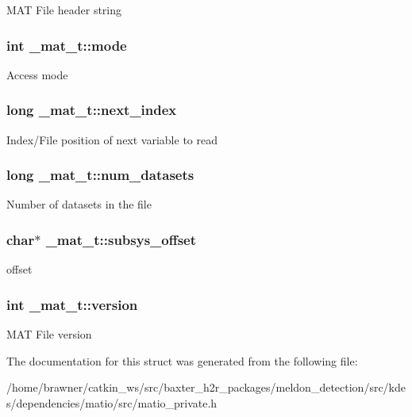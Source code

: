 M\-A\-T File header string \hypertarget{struct__mat__t_aa43288b63b8edb7cadf0b79e2d1df2ee}{
\subsubsection[{mode}]{\setlength{\rightskip}{0pt plus 5cm}int \-\_\-mat\-\_\-t\-::mode}}\label{struct__mat__t_aa43288b63b8edb7cadf0b79e2d1df2ee}
Access mode \hypertarget{struct__mat__t_ab673fe0b330cf4666a66924e37d908d8}{
\subsubsection[{next\-\_\-index}]{\setlength{\rightskip}{0pt plus 5cm}long \-\_\-mat\-\_\-t\-::next\-\_\-index}}\label{struct__mat__t_ab673fe0b330cf4666a66924e37d908d8}
Index/\-File position of next variable to read \hypertarget{struct__mat__t_afa714cbc14c9846e8e62df7cae0a9181}{
\subsubsection[{num\-\_\-datasets}]{\setlength{\rightskip}{0pt plus 5cm}long \-\_\-mat\-\_\-t\-::num\-\_\-datasets}}\label{struct__mat__t_afa714cbc14c9846e8e62df7cae0a9181}
Number of datasets in the file \hypertarget{struct__mat__t_a19317c01209959d755d69311960d3eec}{
\subsubsection[{subsys\-\_\-offset}]{\setlength{\rightskip}{0pt plus 5cm}char$\ast$ \-\_\-mat\-\_\-t\-::subsys\-\_\-offset}}\label{struct__mat__t_a19317c01209959d755d69311960d3eec}
offset \hypertarget{struct__mat__t_a729c2bc0afc97485057a5af425635b1a}{
\subsubsection[{version}]{\setlength{\rightskip}{0pt plus 5cm}int \-\_\-mat\-\_\-t\-::version}}\label{struct__mat__t_a729c2bc0afc97485057a5af425635b1a}
M\-A\-T File version 

The documentation for this struct was generated from the following file\-:\begin{DoxyCompactItemize}
\item 
/home/brawner/catkin\-\_\-ws/src/baxter\-\_\-h2r\-\_\-packages/meldon\-\_\-detection/src/kdes/dependencies/matio/src/matio\-\_\-private.\-h\end{DoxyCompactItemize}
